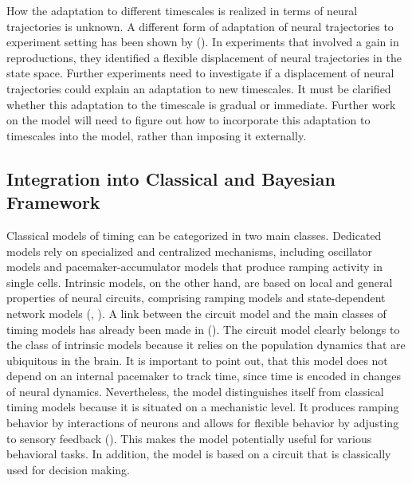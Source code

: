 \documentclass[10pt]{article}
\begin{document}
How the adaptation to different timescales is realized in terms of neural trajectories is unknown. 
A different form of adaptation of neural trajectories to experiment setting has been shown by \citeauthor{Remington2018} (\citeyear{Remington2018}). In experiments that involved a gain in reproductions, they identified a flexible displacement of neural trajectories in the state space.
Further experiments need to investigate if a displacement of neural trajectories could explain an adaptation to new timescales. It must be clarified whether this adaptation to the timescale is gradual or immediate. 
Further work on the model will need to figure out how to incorporate this adaptation to timescales into the model, rather than imposing it externally.

\subsection{Integration into Classical and Bayesian Framework}
Classical models of timing can be categorized in two main classes. 
Dedicated models rely on specialized and centralized mechanisms, including oscillator models and pacemaker-accumulator models that produce ramping activity in single cells.
Intrinsic models, on the other hand, are based on local and general properties of neural circuits, comprising ramping models and state-dependent network models (\cite{Goel2014}, \cite{Paton2018}).
A link between the circuit model and the main classes of timing models has already been made in \citeauthor{Egger2020} (\citeyear{Egger2020}).
The circuit model clearly belongs to the class of intrinsic models because it relies on the population dynamics that are ubiquitous in the brain.
It is important to point out, that this model does not depend on an internal pacemaker to track time, since time is encoded in changes of neural dynamics.  
Nevertheless, the model distinguishes itself from classical timing models because it is situated on a mechanistic level.
It produces ramping behavior by interactions of neurons and allows for flexible behavior by adjusting to sensory feedback (\cite{Egger2020}).
This makes the model potentially useful for various behavioral tasks. In addition, the model is based on a circuit that is classically used for decision making. 
\end{document}
